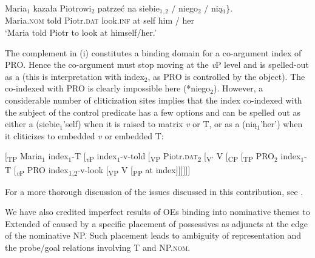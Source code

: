 \documentclass[output=paper,nonflat,colorlinks,citecolor=brown,newtxmath]{langsci/langscibook}
\begin{document}
{\ea
\gll Maria$_1$ kazała Piotrowi$_2$ patrzeć na \minsp{\{} siebie$_1$$_,$$_2$ / \minsp{*} niego$_2$ / nią$_1$\}.\\
Maria.\textsc{nom} told Piotr.\textsc{dat} look.\textsc{inf} at {} self {} {} him / her\\
\glt `Maria told Piotr to look at himself/her.’
\z

\noindent The  complement in (i) constitutes a binding domain for a co-argument index of PRO. Hence the co-argument must stop moving at the \textit{v}P level and is spelled-out as a  (this is interpretation with index$_2$, as PRO is controlled by the object). The  co-indexed with PRO is clearly impossible here (*niego$_2$). However, a considerable number of cliticization sites implies that the index co-indexed with the subject of the control predicate has a few options and can be spelled out as either a  (siebie$_1$’self) when it is raised to matrix \textit{v} or T, or as a  (nią$_1$’her’) when it cliticizes to embedded \textit{v} or embedded T:


\ea
$[$\textsubscript{TP} Maria$_1$ index$_1$-T [\textsubscript{\textit{v}P} index$_1$-v-told [\textsubscript{VP} Piotr.\textsc{dat}\textsubscript{2} [\textsubscript{V’} V [\textsubscript{CP} [\textsubscript{TP} PRO$_2$ index$_1$-T [\textsubscript{\textit{v}P} PRO index\textsubscript{1,2}-v-look [\textsubscript{VP} V [\textsubscript{PP} at index$]]]]]]$
\z

\noindent For a more thorough discussion of the issues discussed in this contribution, see \cite{witkosetal_forth}.} We have also credited imperfect results of  OEs binding into nominative themes to Extended  of \cite{rizzi1990} caused by a specific placement of possessives as adjuncts at the edge of the nominative NP. Such placement leads to ambiguity of representation and the probe/goal relations involving T and NP.\textsc{nom}.
\largerpage[2]


%
\end{document}
